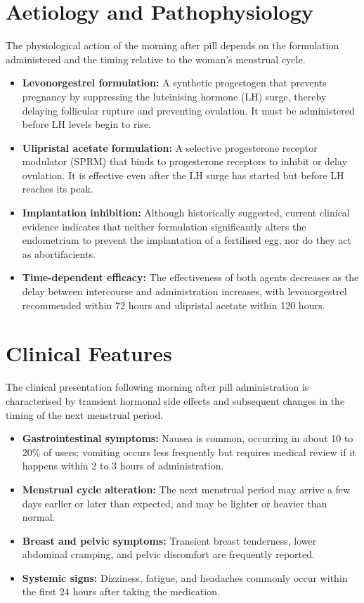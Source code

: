 \section*{Aetiology and Pathophysiology}
The physiological action of the morning after pill depends on the formulation administered and the timing relative to the woman's menstrual cycle.
\begin{itemize}
    \item \textbf{Levonorgestrel formulation:} A synthetic progestogen that prevents pregnancy by suppressing the luteinising hormone (LH) surge, thereby delaying follicular rupture and preventing ovulation. It must be administered before LH levels begin to rise.
    \item \textbf{Ulipristal acetate formulation:} A selective progesterone receptor modulator (SPRM) that binds to progesterone receptors to inhibit or delay ovulation. It is effective even after the LH surge has started but before LH reaches its peak.
    \item \textbf{Implantation inhibition:} Although historically suggested, current clinical evidence indicates that neither formulation significantly alters the endometrium to prevent the implantation of a fertilised egg, nor do they act as abortifacients.
    \item \textbf{Time-dependent efficacy:} The effectiveness of both agents decreases as the delay between intercourse and administration increases, with levonorgestrel recommended within 72 hours and ulipristal acetate within 120 hours.
\end{itemize}

\section*{Clinical Features}
The clinical presentation following morning after pill administration is characterised by transient hormonal side effects and subsequent changes in the timing of the next menstrual period.
\begin{itemize}
    \item \textbf{Gastrointestinal symptoms:} Nausea is common, occurring in about 10 to 20\% of users; vomiting occurs less frequently but requires medical review if it happens within 2 to 3 hours of administration.
    \item \textbf{Menstrual cycle alteration:} The next menstrual period may arrive a few days earlier or later than expected, and may be lighter or heavier than normal.
    \item \textbf{Breast and pelvic symptoms:} Transient breast tenderness, lower abdominal cramping, and pelvic discomfort are frequently reported.
    \item \textbf{Systemic signs:} Dizziness, fatigue, and headaches commonly occur within the first 24 hours after taking the medication.
\end{itemize}


